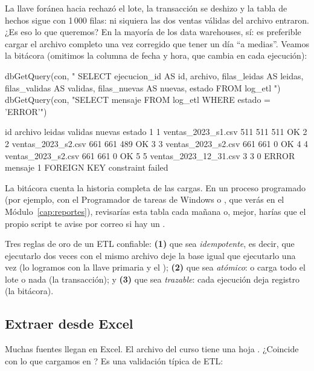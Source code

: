La llave foránea hacia  rechazó el lote, la
transacción se deshizo y la tabla de hechos sigue con 1\,000 filas: ni
siquiera las dos ventas válidas del archivo entraron. ¿Es eso lo que
queremos? En la mayoría de los data warehouses, sí: es preferible cargar el
archivo completo una vez corregido que tener un día ``a medias''. Veamos la
bitácora (omitimos la columna de fecha y hora, que cambia en cada
ejecución):

\begin{rcode}
dbGetQuery(con, "
  SELECT ejecucion_id AS id, archivo, filas_leidas AS leidas,
         filas_validas AS validas, filas_nuevas AS nuevas, estado
  FROM log_etl
")
dbGetQuery(con, "SELECT mensaje FROM log_etl WHERE estado = 'ERROR'")
\end{rcode}

\begin{rsalida}
  id               archivo leidas validas nuevas estado
1  1    ventas_2023_s1.csv    511     511    511     OK
2  2    ventas_2023_s2.csv    661     661    489     OK
3  3    ventas_2023_s2.csv    661     661      0     OK
4  4    ventas_2023_s2.csv    661     661      0     OK
5  5 ventas_2023_12_31.csv      3       3      0  ERROR
                        mensaje
1 FOREIGN KEY constraint failed
\end{rsalida}

La bitácora cuenta la historia completa de las cargas. En un proceso
programado (por ejemplo, con el Programador de tareas de Windows o
, que verás en el Módulo~\ref{cap:reportes}), revisarías esta
tabla cada mañana o, mejor, harías que el propio script te avise por
correo si hay un .

\begin{consejo}
Tres reglas de oro de un ETL confiable: \textbf{(1)} que sea
\emph{idempotente}, es decir, que ejecutarlo dos veces con el mismo archivo
deje la base igual que ejecutarlo una vez (lo logramos con la llave primaria
y el ); \textbf{(2)} que sea \emph{atómico}: o carga
todo el lote o nada (la transacción); y \textbf{(3)} que sea
\emph{trazable}: cada ejecución deja registro (la bitácora).
\end{consejo}

\subsection{Extraer desde Excel}

Muchas fuentes llegan en Excel. El archivo  del
curso tiene una hoja . ¿Coincide con lo que cargamos en
? Es una validación típica de ETL:

